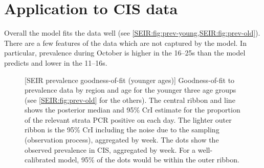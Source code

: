 \documentclass[thesis.tex]{subfiles}
\begin{document}
\section{Application to CIS data} \label{SEIR:sec:application}

Overall the model fits the data well (see \cref{SEIR:fig:prev-young,SEIR:fig:prev-old}).
There are a few features of the data which are not captured by the model.
In particular, prevalence during October is higher in the 16--25s than the model predicts and lower in the 11--16s.
\begin{figure}
    \vspace{-3cm}
    \captionsetup{width=0.8\paperwidth}
    [SEIR prevalence goodness-of-fit (younger ages)]{%
        Goodness-of-fit to prevalence data by region and age for the younger three age groups (see \cref{SEIR:fig:prev-old} for the others).
        The central ribbon and line shows the posterior median and 95\% CrI estimate for the proportion of the relevant strata PCR positive on each day.
        The lighter outer ribbon is the 95\% CrI including the noise due to the sampling (\ie observation process), aggregated by week.
        The dots show the observed prevalence in CIS, aggregated by week.
        For a well-calibrated model, 95\% of the dots would be within the outer ribbon.
    }
    \label{SEIR:fig:prev-young}
\end{figure}
\end{document}
